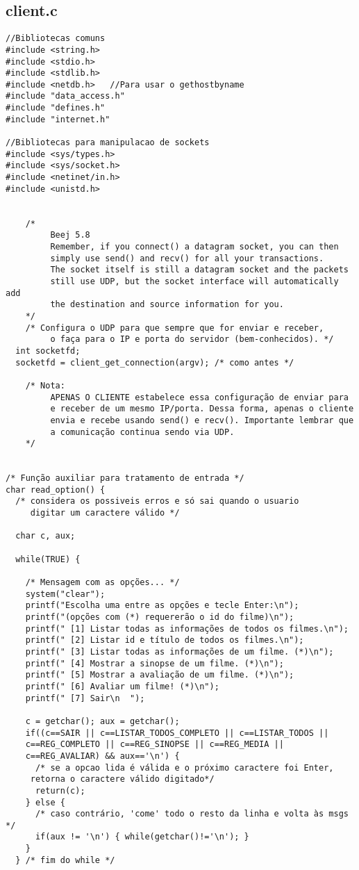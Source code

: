 \documentclass[11pt,twoside]{article}
\begin{document}
\subsection{client.c}       %
\begin{verbatim}
//Bibliotecas comuns
#include <string.h>
#include <stdio.h>
#include <stdlib.h>
#include <netdb.h>   //Para usar o gethostbyname
#include "data_access.h"
#include "defines.h"
#include "internet.h"

//Bibliotecas para manipulacao de sockets
#include <sys/types.h>
#include <sys/socket.h>
#include <netinet/in.h>
#include <unistd.h>


	/* 
		 Beej 5.8
		 Remember, if you connect() a datagram socket, you can then
		 simply use send() and recv() for all your transactions. 
		 The socket itself is still a datagram socket and the packets
		 still use UDP, but the socket interface will automatically add 
		 the destination and source information for you.
	*/
	/* Configura o UDP para que sempre que for enviar e receber,
		 o faça para o IP e porta do servidor (bem-conhecidos). */
  int socketfd;
  socketfd = client_get_connection(argv); /* como antes */

	/* Nota:
		 APENAS O CLIENTE estabelece essa configuração de enviar para 
		 e receber de um mesmo IP/porta. Dessa forma, apenas o cliente 
		 envia e recebe usando send() e recv(). Importante lembrar que 
		 a comunicação continua sendo via UDP.
	*/


/* Função auxiliar para tratamento de entrada */
char read_option() {
  /* considera os possiveis erros e só sai quando o usuario
     digitar um caractere válido */

  char c, aux;

  while(TRUE) {

    /* Mensagem com as opções... */
    system("clear");
    printf("Escolha uma entre as opções e tecle Enter:\n");
    printf("(opções com (*) requererão o id do filme)\n");
    printf(" [1] Listar todas as informações de todos os filmes.\n");
    printf(" [2] Listar id e título de todos os filmes.\n");
    printf(" [3] Listar todas as informações de um filme. (*)\n");
    printf(" [4] Mostrar a sinopse de um filme. (*)\n");
    printf(" [5] Mostrar a avaliação de um filme. (*)\n");
    printf(" [6] Avaliar um filme! (*)\n");
    printf(" [7] Sair\n  ");

    c = getchar(); aux = getchar();
    if((c==SAIR || c==LISTAR_TODOS_COMPLETO || c==LISTAR_TODOS ||
	c==REG_COMPLETO || c==REG_SINOPSE || c==REG_MEDIA ||
	c==REG_AVALIAR) && aux=='\n') {
      /* se a opcao lida é válida e o próximo caractere foi Enter, 
	 retorna o caractere válido digitado*/
      return(c);
    } else {
      /* caso contrário, 'come' todo o resto da linha e volta às msgs */
      if(aux != '\n') { while(getchar()!='\n'); }
    }
  } /* fim do while */


\end{verbatim}
\end{document}
